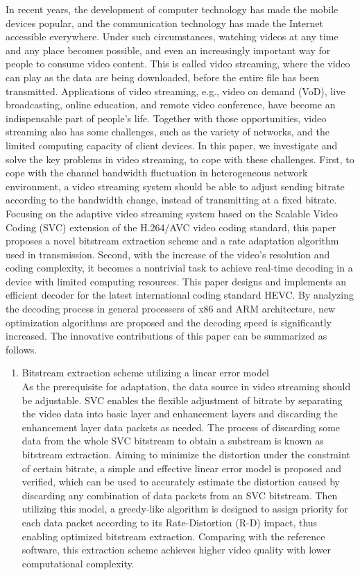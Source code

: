 \begin{eabstract}
In recent years, the development of computer technology has made the mobile devices popular, and the communication technology has made the Internet accessible everywhere. Under such circumstances, watching videos at any time and any place becomes possible, and even an increasingly important way for people to consume video content. This is called video streaming, where the video can play as the data are being downloaded, before the entire file has been transmitted. Applications of video streaming, e.g., video on demand (VoD), live broadcasting, online education, and remote video conference, have become an indispensable part of people's life. Together with those opportunities, video streaming also has some challenges, such as the variety of networks, and the limited computing capacity of client devices. In this paper, we investigate and solve the key problems in video streaming, to cope with these challenges. First, to cope with the channel bandwidth fluctuation in heterogeneous network environment, a video streaming system should be able to adjust sending bitrate according to the bandwidth change, instead of transmitting at a fixed bitrate. Focusing on the adaptive video streaming system based on the Scalable Video Coding (SVC) extension of the H.264/AVC video coding standard, this paper proposes a novel bitstream extraction scheme and a rate adaptation algorithm used in transmission. Second, with the increase of the video's resolution and coding complexity, it becomes a nontrivial task to achieve real-time decoding in a device with limited computing resources. This paper designs and implements an efficient decoder for the latest international coding standard HEVC. By analyzing the decoding process in general processers of x86 and ARM architecture, new optimization algorithms are proposed and the decoding speed is significantly increased. The innovative contributions of this paper can be summarized as follows.
\begin{enumerate}
\item {Bitstream extraction scheme utilizing a linear error model}\\
As the prerequisite for adaptation, the data source in video streaming should be adjustable. SVC enables the flexible adjustment of bitrate by separating the video data into basic layer and enhancement layers and discarding the enhancement layer data packets as needed. The process of discarding some data from the whole SVC bitstream to obtain a substream is known as bitstream extraction. Aiming to minimize the distortion under the constraint of certain bitrate, a simple and effective linear error model is proposed and verified, which can be used to accurately estimate the distortion caused by discarding any combination of data packets from an SVC bitstream. Then utilizing this model, a greedy-like algorithm is designed to assign priority for each data packet according to its Rate-Distortion (R-D) impact, thus enabling optimized bitstream extraction. Comparing with the reference software, this extraction scheme achieves higher video quality with lower computational complexity.

\end{enumerate}
\end{eabstract}

